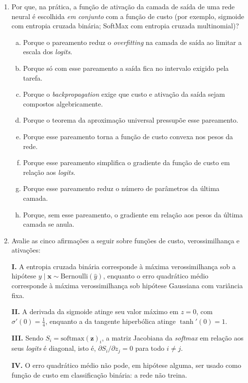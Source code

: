\documentclass{dlproblemset}
\begin{document}
\begin{enumerate}[1)]
    \item Por que, na prática, a função de ativação da camada de saída de uma rede neural é escolhida \emph{em conjunto} com a função de custo (por exemplo, sigmoide com entropia cruzada binária; SoftMax com entropia cruzada multinomial)?
    \begin{enumerate}[(a)]
        \item Porque o pareamento reduz o \textit{overfitting} na camada de saída ao limitar a escala dos \textit{logits}.
        \item Porque só com esse pareamento a saída fica no intervalo exigido pela tarefa.
        \item Porque o \textit{backpropagation} exige que custo e ativação da saída sejam compostos algebricamente.
        \item Porque o teorema da aproximação universal pressupõe esse pareamento.
        \item Porque esse pareamento torna a função de custo convexa nos pesos da rede.
        \item Porque esse pareamento simplifica o gradiente da função de custo em relação aos \textit{logits}.
        \item Porque esse pareamento reduz o número de parâmetros da última camada.
        \item Porque, sem esse pareamento, o gradiente em relação aos pesos da última camada se anula.
    \end{enumerate}

    \item Avalie as cinco afirmações a seguir sobre funções de custo, verossimilhança e ativações:

    \textbf{I.} A entropia cruzada binária corresponde à máxima verossimilhança sob a hipótese $y \mid \mathbf{x} \sim \mathrm{Bernoulli}(\hat{y})$, enquanto o erro quadrático médio corresponde à máxima verossimilhança sob hipótese Gaussiana com variância fixa.

    \textbf{II.} A derivada da sigmoide atinge seu valor máximo em $z = 0$, com $\sigma'(0) = \tfrac{1}{4}$, enquanto a da tangente hiperbólica atinge $\tanh'(0) = 1$.

    \textbf{III.} Sendo $S_i = \mathrm{softmax}(\mathbf{z})_i$, a matriz Jacobiana da \textit{softmax} em relação aos seus \textit{logits} é diagonal, isto é, $\partial S_i / \partial z_j = 0$ para todo $i \neq j$.

    \textbf{IV.} O erro quadrático médio não pode, em hipótese alguma, ser usado como função de custo em classificação binária: a rede não treina.


\end{enumerate}
\end{document}
